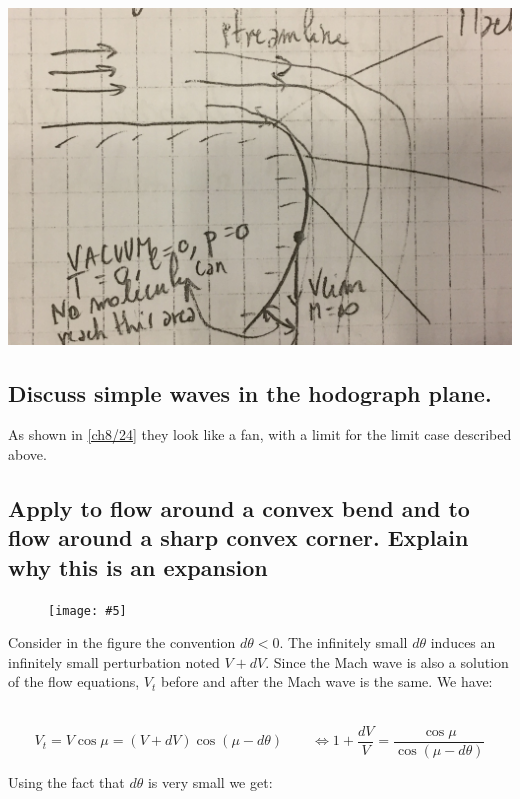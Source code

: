 \documentclass[british,french,11pt, a4paper, openany]{article}
\newcommand{\wrapfig}[6]{%
	\begin{figure}%
		\vspace{-5mm}%
		\texttt{[image: \#5]}%
		\captionof{figure}{}%
		\label{#6}%
	\end{figure}%
}
\begin{document}
\begin{center}
	\includegraphics[scale=0.08]{ch8/24}
	\label{ch8/24}
\end{center}

\subsection{Discuss simple waves in the hodograph plane.}

As shown in \autoref{ch8/24} they look like a fan, with a limit for the limit case described above.

\subsection{Apply to flow around a convex bend and to flow around a sharp convex corner. Explain why this is an expansion}

\wrapfig{7}{l}{6}{0.15}{ch8/6}{ch8/6}
Consider in the figure the convention $d\theta < 0$. The infinitely small $d\theta$ induces an infinitely small perturbation noted $V+dV$. Since the Mach wave is also a solution of the flow equations, $V_t$ before and after the Mach wave is the same. We have: 

\ \\

\begin{equation}
V_t = V\cos \mu = (V+dV) \cos (\mu - d\theta) \qquad \Leftrightarrow 1+\frac{dV}{V} = \frac{\cos \mu }{\cos (\mu - d\theta)}
\label{eq:8.63}
\end{equation}

Using the fact that $d\theta$ is very small we get: 
\end{document}
